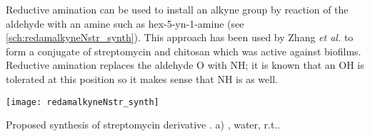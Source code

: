 Reductive amination can be used to install an alkyne group by reaction of the aldehyde with an amine such as hex-5-yn-1-amine  (see \ref{sch:redamalkyneNstr_synth}). This approach has been used by Zhang \textit{et al.}\cite{Zhang2013} to form a conjugate of streptomycin  and chitosan which was active against biofilms. 
Reductive amination replaces the aldehyde O with NH; it is known that an OH is tolerated at this position so it makes sense that NH is as well.

\begin{scheme}[H]
	\begin{center}
		\texttt{[image: redamalkyneNstr\_synth]}
		\caption{Proposed synthesis of streptomycin derivative . 
		a) , water, r.t..
		\label{sch:redamalkyneNstr_synth}}
	\end{center}
\end{scheme}
